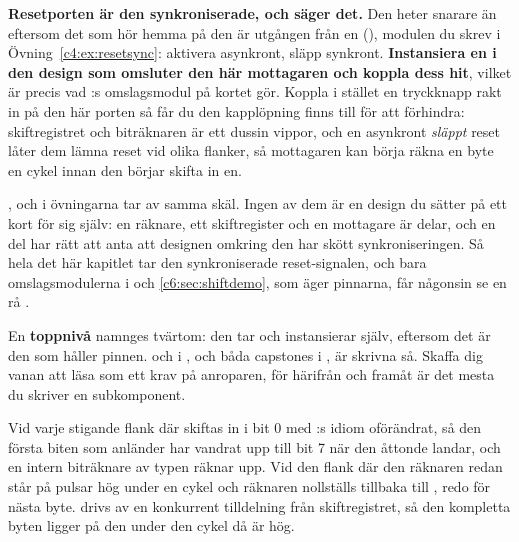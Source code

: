 \begin{aside}
\textbf{Resetporten är den synkroniserade, och  säger det.} Den heter 
snarare än  eftersom det som hör hemma på den är utgången från en 
(), modulen du skrev i Övning~\ref{c4:ex:resetsync}: aktivera asynkront,
släpp synkront. \textbf{Instansiera en i den design som omsluter den här mottagaren och koppla dess
 hit}, vilket är precis vad :s omslagsmodul på kortet
gör. Koppla i stället en tryckknapp rakt in på den här porten så får du den kapplöpning
 finns till för att förhindra: skiftregistret och biträknaren är ett dussin vippor,
och en asynkront \emph{släppt} reset låter dem lämna reset vid olika flanker, så mottagaren kan
börja räkna en byte en cykel innan den börjar skifta in en.

,  och  i övningarna tar  av samma skäl.
Ingen av dem är en design du sätter på ett kort för sig själv: en räknare, ett skiftregister och en
mottagare är delar, och en del har rätt att anta att designen omkring den har skött
synkroniseringen. Så hela det här kapitlet tar den synkroniserade reset-signalen, och bara
omslagsmodulerna i  och \ref{c6:sec:shiftdemo}, som äger pinnarna, får
någonsin se en rå .

En \textbf{toppnivå} namnges tvärtom: den tar  och instansierar 
själv, eftersom det är den som håller pinnen.  och  i
, och båda capstones i , är skrivna så. Skaffa dig vanan att läsa
 som ett krav på anroparen, för härifrån och framåt är det mesta du skriver en
subkomponent.
\end{aside}


Vid varje stigande flank där  skiftas  in i bit 0 med
:s idiom oförändrat, så den första biten som anländer har vandrat upp till bit 7
när den åttonde landar, och en intern biträknare av typen  räknar upp.
Vid den flank där den räknaren redan står på  pulsar  hög under en cykel
och räknaren nollställs tillbaka till , redo för nästa byte.  drivs av en
konkurrent tilldelning från skiftregistret, så den kompletta byten ligger på den under den cykel då
 är hög.


